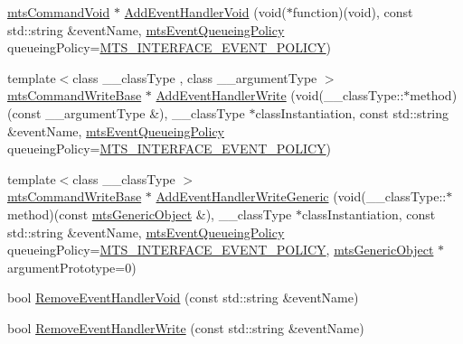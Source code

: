 \begin{DoxyCompactItemize}
\item 
\hyperlink{classmts_command_void}{mts\-Command\-Void} $\ast$ \hyperlink{classmts_interface_required_a631bc74359f27ef1a3ef07e39d57c25e}{Add\-Event\-Handler\-Void} (void($\ast$function)(void), const std\-::string \&event\-Name, \hyperlink{mts_forward_declarations_8h_a9286ac2ca46e5bcd57059550faa96916}{mts\-Event\-Queueing\-Policy} queueing\-Policy=\hyperlink{mts_forward_declarations_8h_a9286ac2ca46e5bcd57059550faa96916a3d4338e85690d50e9ab167be77cdefa0}{M\-T\-S\-\_\-\-I\-N\-T\-E\-R\-F\-A\-C\-E\-\_\-\-E\-V\-E\-N\-T\-\_\-\-P\-O\-L\-I\-C\-Y})
\item 
{\footnotesize template$<$class \-\_\-\-\_\-class\-Type , class \-\_\-\-\_\-argument\-Type $>$ }\\\hyperlink{classmts_command_write_base}{mts\-Command\-Write\-Base} $\ast$ \hyperlink{classmts_interface_required_a5259260a2f54575de9bbe8b2636430b8}{Add\-Event\-Handler\-Write} (void(\-\_\-\-\_\-class\-Type\-::$\ast$method)(const \-\_\-\-\_\-argument\-Type \&), \-\_\-\-\_\-class\-Type $\ast$class\-Instantiation, const std\-::string \&event\-Name, \hyperlink{mts_forward_declarations_8h_a9286ac2ca46e5bcd57059550faa96916}{mts\-Event\-Queueing\-Policy} queueing\-Policy=\hyperlink{mts_forward_declarations_8h_a9286ac2ca46e5bcd57059550faa96916a3d4338e85690d50e9ab167be77cdefa0}{M\-T\-S\-\_\-\-I\-N\-T\-E\-R\-F\-A\-C\-E\-\_\-\-E\-V\-E\-N\-T\-\_\-\-P\-O\-L\-I\-C\-Y})
\item 
{\footnotesize template$<$class \-\_\-\-\_\-class\-Type $>$ }\\\hyperlink{classmts_command_write_base}{mts\-Command\-Write\-Base} $\ast$ \hyperlink{classmts_interface_required_a07e4e7e34e64cdb2fed11147b3e33293}{Add\-Event\-Handler\-Write\-Generic} (void(\-\_\-\-\_\-class\-Type\-::$\ast$method)(const \hyperlink{classmts_generic_object}{mts\-Generic\-Object} \&), \-\_\-\-\_\-class\-Type $\ast$class\-Instantiation, const std\-::string \&event\-Name, \hyperlink{mts_forward_declarations_8h_a9286ac2ca46e5bcd57059550faa96916}{mts\-Event\-Queueing\-Policy} queueing\-Policy=\hyperlink{mts_forward_declarations_8h_a9286ac2ca46e5bcd57059550faa96916a3d4338e85690d50e9ab167be77cdefa0}{M\-T\-S\-\_\-\-I\-N\-T\-E\-R\-F\-A\-C\-E\-\_\-\-E\-V\-E\-N\-T\-\_\-\-P\-O\-L\-I\-C\-Y}, \hyperlink{classmts_generic_object}{mts\-Generic\-Object} $\ast$argument\-Prototype=0)
\item 
bool \hyperlink{classmts_interface_required_aade550860b428236c9505550d1476c03}{Remove\-Event\-Handler\-Void} (const std\-::string \&event\-Name)
\item 
bool \hyperlink{classmts_interface_required_a3874cddc209b1dde7f52c9dd4d5933a4}{Remove\-Event\-Handler\-Write} (const std\-::string \&event\-Name)
\end{DoxyCompactItemize}
